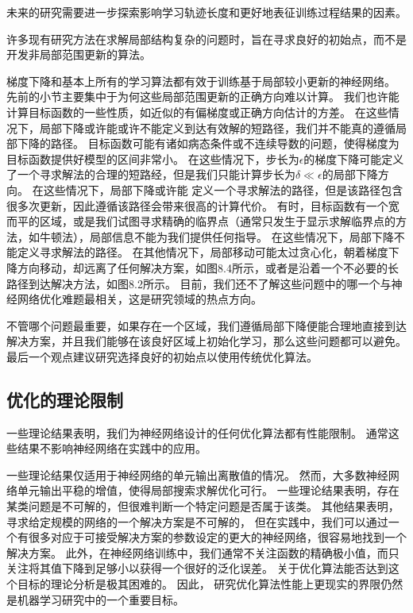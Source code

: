
未来的研究需要进一步探索影响学习轨迹长度和更好地表征训练过程结果的因素。

许多现有研究方法在求解局部结构复杂的问题时，旨在寻求良好的初始点，而不是开发非局部范围更新的算法。

梯度下降和基本上所有的学习算法都有效于训练基于局部较小更新的神经网络。
先前的小节主要集中于为何这些局部范围更新的正确方向难以计算。
我们也许能计算目标函数的一些性质，如近似的有偏梯度或正确方向估计的方差。
在这些情况下，局部下降或许能或许不能定义到达有效解的短路径，我们并不能真的遵循局部下降的路径。
目标函数可能有诸如病态条件或不连续导数的问题，使得梯度为目标函数提供好模型的区间非常小。
在这些情况下，步长为$\epsilon$的梯度下降可能定义了一个寻求解法的合理的短路经，但是我们只能计算步长为$\delta \ll \epsilon$的局部下降方向。
在这些情况下，局部下降或许能 定义一个寻求解法的路径，但是该路径包含很多次更新，因此遵循该路径会带来很高的计算代价。
有时，目标函数有一个宽而平的区域，或是我们试图寻求精确的临界点（通常只发生于显示求解临界点的方法，如牛顿法），局部信息不能为我们提供任何指导。
在这些情况下，局部下降不能定义寻求解法的路径。
在其他情况下，局部移动可能太过贪心化，朝着梯度下降方向移动，却远离了任何解决方案，如图8.4所示，或者是沿着一个不必要的长路径到达解决方法，如图8.2所示。
目前，我们还不了解这些问题中的哪一个与神经网络优化难题最相关，这是研究领域的热点方向。


不管哪个问题最重要，如果存在一个区域，我们遵循局部下降便能合理地直接到达解决方案，并且我们能够在该良好区域上初始化学习，那么这些问题都可以避免。
最后一个观点建议研究选择良好的初始点以使用传统优化算法。

\subsection{优化的理论限制}
\label{sec:theoretical_limits_of_optimization}
一些理论结果表明，我们为神经网络设计的任何优化算法都有性能限制\citep{Blum92,JuddBook,wolpert96no}。
通常这些结果不影响神经网络在实践中的应用。

一些理论结果仅适用于神经网络的单元输出离散值的情况。
然而，大多数神经网络单元输出平稳的增值，使得局部搜索求解优化可行。
一些理论结果表明，存在某类问题是不可解的，但很难判断一个特定问题是否属于该类。
其他结果表明，寻求给定规模的网络的一个解决方案是不可解的，
但在实践中，我们可以通过一个有很多对应于可接受解决方案的参数设定的更大的神经网络，很容易地找到一个解决方案。
此外，在神经网络训练中，我们通常不关注函数的精确极小值，而只关注将其值下降到足够小以获得一个很好的泛化误差。
关于优化算法能否达到这个目标的理论分析是极其困难的。
因此， 研究优化算法性能上更现实的界限仍然是机器学习研究中的一个重要目标。


